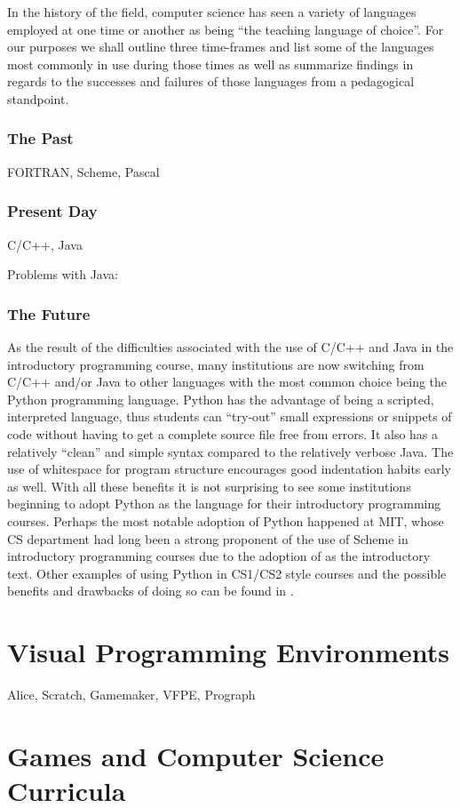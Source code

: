 In the history of the field, computer science has seen a variety of languages employed at one time or another as being ``the teaching language of choice''.  For our purposes we shall outline three time-frames and list some of the languages most commonly in use during those times as well as summarize findings in regards to the successes and failures of those languages from a pedagogical standpoint.

\subsubsection{The Past}

FORTRAN, Scheme, Pascal

\subsubsection{Present Day}

C/C++, Java

Problems with Java: \cite{Bos98,Benander04}

\subsubsection{The Future}

As the result of the difficulties associated with the use of C/C++ and Java in the introductory programming course, many institutions are now switching from C/C++ and/or Java to other languages with the most common choice being the Python programming language\cite{python}.  Python has the advantage of being a scripted, interpreted language, thus students can ``try-out'' small expressions or snippets of code without having to get a complete source file free from errors.  It also has a relatively ``clean'' and simple syntax compared to the relatively verbose Java.  The use of whitespace for program structure encourages good indentation habits early as well.  With all these benefits it is not surprising to see some institutions beginning to adopt Python as the language for their introductory programming courses.  Perhaps the most notable adoption of Python happened at MIT, whose CS department had long been a strong proponent of the use of Scheme in introductory programming courses due to the adoption of \cite{SICPbook} as the introductory text.  Other examples of using Python in CS1/CS2 style courses and the possible benefits and drawbacks of doing so can be found in \cite{Radenski06,Shannon03,Agarwal05,Agarwal08}.

\section{Visual Programming Environments}

Alice, Scratch, Gamemaker, VFPE, Prograph

\section{Games and Computer Science Curricula}

